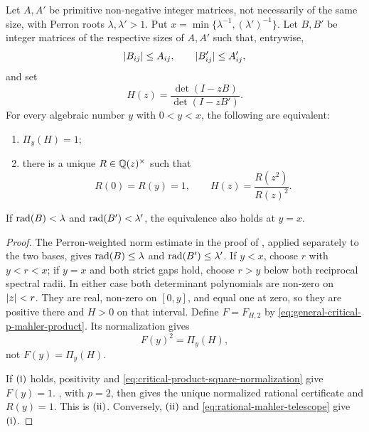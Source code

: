 \begin{theorem}
\label{thm:determinant-boundary-lifting}
Let \(A,A'\) be primitive non-negative integer matrices, not necessarily of
the same size, with Perron roots \(\lambda,\lambda'>1\).
Put \(x=\min\{\lambda^{-1},(\lambda')^{-1}\}\).  Let \(B,B'\) be integer
matrices of the respective sizes of \(A,A'\) such that, entrywise,
\[
 \lvert B_{ij} \rvert\le A_{ij},
 \qquad \lvert B'_{ij} \rvert\le A'_{ij},
\]
and set
\[
 H(z)=\frac{\det(I-zB)}{\det(I-zB')}.
\]
For every algebraic number \(y\) with \(0<y<x\), the following are
equivalent:
\begin{enumerate}[label=\textup{(\roman*)},leftmargin=*]
 \item \(\Pi_y(H)=1\);
 \item there is a unique \(R\in\mathbb{Q}(z)^\times\) such that
 \[
  R(0)=R(y)=1,
  \qquad H(z)=\frac{R(z^2)}{R(z)^2}.
 \]
\end{enumerate}
If \(\operatorname{rad}(B)<\lambda\) and \(\operatorname{rad}(B')<\lambda'\), the equivalence also
holds at \(y=x\).
\end{theorem}

\begin{proof}
The Perron-weighted norm estimate in the proof of
, applied separately to the two bases,
gives \(\operatorname{rad}(B)\le\lambda\) and \(\operatorname{rad}(B')\le\lambda'\).  If \(y<x\), choose
\(r\) with \(y<r<x\); if \(y=x\) and both strict gaps hold, choose \(r>y\)
below both reciprocal spectral radii.  In either case both determinant
polynomials are non-zero on \(\lvert z \rvert<r\).  They are real, non-zero on
\([0,y]\), and equal one at zero, so they are positive there and \(H>0\) on
that interval.  Define \(F=F_{H,2}\) by
\eqref{eq:general-critical-p-mahler-product}.  Its normalization gives
\begin{equation}\label{eq:critical-product-square-normalization}
 F(y)^2=\Pi_y(H),
\end{equation}
not \(F(y)=\Pi_y(H)\).

If \(\textup{(i)}\) holds, positivity and
\eqref{eq:critical-product-square-normalization} give \(F(y)=1\).
, with \(p=2\), then gives the
unique normalized rational certificate and \(R(y)=1\).  This is
\(\textup{(ii)}\).  Conversely, \(\textup{(ii)}\) and
\eqref{eq:rational-mahler-telescope} give \(\textup{(i)}\).
\end{proof}

